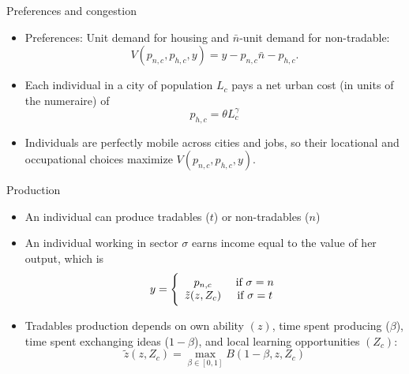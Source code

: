 \documentclass[11pt,notes=hide,aspectratio=169]{beamer}
\begin{document}
\begin{frame}{Preferences and congestion}
\begin{itemize}
	\item Preferences: Unit demand for housing and $\bar{n}$-unit demand for non-tradable:
	\begin{equation*}
	V(p_{n,c},p_{h,c},y)= y-p_{n,c}\bar{n}-p_{h,c}. \label{indirect_utility}
	\end{equation*}
	\item Each individual in a city of population $L_c$ pays a net urban cost (in units of the numeraire) of 
	\begin{equation*}
	p_{h,c} = \theta L_c^\gamma
	\end{equation*}
	\item Individuals are perfectly mobile across cities and jobs, so their locational and occupational choices maximize $V(p_{n,c},p_{h,c},y)$.
\end{itemize}
\end{frame}
\begin{frame}{Production}
\begin{itemize}
	\item An individual can produce tradables ($t$) or non-tradables ($n$)
	\item An individual working in sector $\sigma$ earns income equal to the value of her output, which is
		\begin{equation*}
		y =  \Bigg\{\begin{array}{cc}
		p_{n,c} & \textnormal{ if } \sigma = n \\
		\tilde{z}(z,{Z}_{c})  & \textnormal{ if } \sigma = t \end{array}
		\end{equation*}
	\item Tradables production depends on own ability $(z)$, time spent producing ($\beta$), time spent exchanging ideas ($1-\beta$), and local learning opportunities $(Z_{c})$:
		\begin{equation*}
		\tilde{z}(z,Z_c) = \max_{\beta\in[0,1]} B(1-\beta,z,Z_c)
		\end{equation*}
\end{itemize}
\end{frame}
\end{document}
